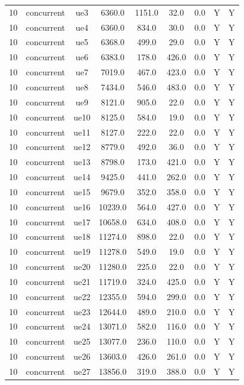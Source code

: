 \begin{table}[ht]
\begin{tabular}{|c|c|c|c|c|c|c|c|c|}
10 & concurrent & ue3 & 6360.0 & 1151.0 & 32.0 & 0.0 & Y & Y \\
10 & concurrent & ue4 & 6360.0 & 834.0 & 30.0 & 0.0 & Y & Y \\
10 & concurrent & ue5 & 6368.0 & 499.0 & 29.0 & 0.0 & Y & Y \\
10 & concurrent & ue6 & 6383.0 & 178.0 & 426.0 & 0.0 & Y & Y \\
10 & concurrent & ue7 & 7019.0 & 467.0 & 423.0 & 0.0 & Y & Y \\
10 & concurrent & ue8 & 7434.0 & 546.0 & 483.0 & 0.0 & Y & Y \\
10 & concurrent & ue9 & 8121.0 & 905.0 & 22.0 & 0.0 & Y & Y \\
10 & concurrent & ue10 & 8125.0 & 584.0 & 19.0 & 0.0 & Y & Y \\
10 & concurrent & ue11 & 8127.0 & 222.0 & 22.0 & 0.0 & Y & Y \\
10 & concurrent & ue12 & 8779.0 & 492.0 & 36.0 & 0.0 & Y & Y \\
10 & concurrent & ue13 & 8798.0 & 173.0 & 421.0 & 0.0 & Y & Y \\
10 & concurrent & ue14 & 9425.0 & 441.0 & 262.0 & 0.0 & Y & Y \\
10 & concurrent & ue15 & 9679.0 & 352.0 & 358.0 & 0.0 & Y & Y \\
10 & concurrent & ue16 & 10239.0 & 564.0 & 427.0 & 0.0 & Y & Y \\
10 & concurrent & ue17 & 10658.0 & 634.0 & 408.0 & 0.0 & Y & Y \\
10 & concurrent & ue18 & 11274.0 & 898.0 & 22.0 & 0.0 & Y & Y \\
10 & concurrent & ue19 & 11278.0 & 549.0 & 19.0 & 0.0 & Y & Y \\
10 & concurrent & ue20 & 11280.0 & 225.0 & 22.0 & 0.0 & Y & Y \\
10 & concurrent & ue21 & 11719.0 & 324.0 & 425.0 & 0.0 & Y & Y \\
10 & concurrent & ue22 & 12355.0 & 594.0 & 299.0 & 0.0 & Y & Y \\
10 & concurrent & ue23 & 12644.0 & 489.0 & 210.0 & 0.0 & Y & Y \\
10 & concurrent & ue24 & 13071.0 & 582.0 & 116.0 & 0.0 & Y & Y \\
10 & concurrent & ue25 & 13077.0 & 236.0 & 110.0 & 0.0 & Y & Y \\
10 & concurrent & ue26 & 13603.0 & 426.0 & 261.0 & 0.0 & Y & Y \\
10 & concurrent & ue27 & 13856.0 & 319.0 & 388.0 & 0.0 & Y & Y \\

\end{tabular}
\end{table}
